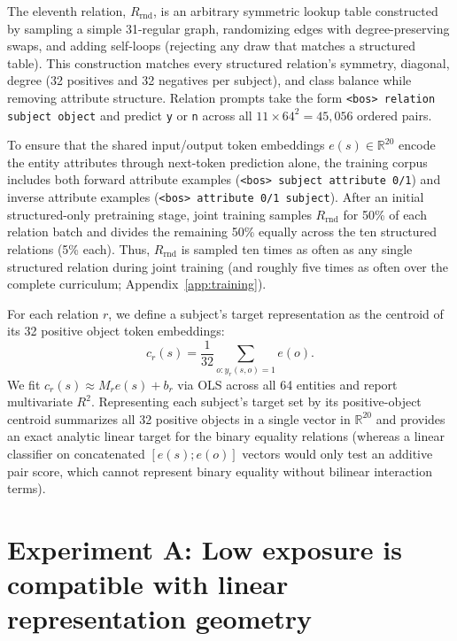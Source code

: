 \documentclass[11pt]{article}
\newcommand{\Rrnd}{R_{\mathrm{rnd}}}
\begin{document}
The eleventh relation, $\Rrnd$, is an arbitrary symmetric lookup table
constructed by sampling a simple 31-regular graph, randomizing edges with
degree-preserving swaps, and adding self-loops (rejecting any draw that matches
a structured table). This construction matches every structured relation's
symmetry, diagonal, degree (32 positives and 32 negatives per subject), and
class balance while removing attribute structure. Relation prompts take the form
\texttt{<bos> relation subject object} and predict \texttt{y} or \texttt{n}
across all $11\times64^2=45{,}056$ ordered pairs.

To ensure that the shared input/output token embeddings $e(s)\in\mathbb{R}^{20}$
encode the entity attributes through next-token prediction alone, the training
corpus includes both forward attribute examples (\texttt{<bos> subject attribute
0/1}) and inverse attribute examples (\texttt{<bos> attribute 0/1 subject}).
After an initial structured-only pretraining stage, joint training samples
$\Rrnd$ for 50\% of each relation batch and divides the remaining 50\% equally
across the ten structured relations (5\% each). Thus, $\Rrnd$ is sampled ten
times as often as any single structured relation during joint training (and
roughly five times as often over the complete curriculum;
Appendix~\ref{app:training}).

For each relation $r$, we define a subject's target representation as the
centroid of its 32 positive object token embeddings:
\begin{equation}
  c_r(s)=\frac{1}{32}\sum_{o:y_r(s,o)=1}e(o).
  \label{eq:centroid}
\end{equation}
We fit $c_r(s)\approx M_re(s)+b_r$ via OLS across all 64 entities and report
multivariate $R^2$. Representing each subject's target set by its positive-object
centroid summarizes all 32 positive objects in a single vector in
$\mathbb{R}^{20}$ and provides an exact analytic linear target for the binary
equality relations (whereas a linear classifier on concatenated $[e(s);e(o)]$
vectors would only test an additive pair score, which cannot represent binary
equality without bilinear interaction terms).

\section{Experiment A: Low exposure is compatible with linear representation geometry}
\label{sec:goal1-results}
\end{document}
